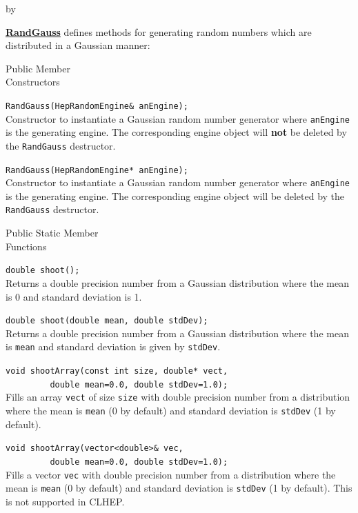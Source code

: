 \documentclass[twoside]{article}
\newcommand{\comp}[1]{\texttt{#1}}%
\newcommand{\entrylabel}[1]{\mbox{\textbf{{#1}}}\hfil}%
\newenvironment{entry}
{\begin{list}{}%
    {\renewcommand{\makelabel}{\entrylabel}%
     \setlength{\labelwidth}{90pt}%
     \setlength{\leftmargin}{\labelwidth}
     \advance\leftmargin by \labelsep%
      }%
    }%
  {\end{list}}
\newcommand{\Entrylabel}[1]%
{\raisebox{0pt}[1ex][0pt]{\makebox[\labelwidth][l]%
    {\parbox[t]{\labelwidth}{\hspace{0pt}\textbf{{#1}}}}}}
\newenvironment{Entry}%
{\renewcommand{\entrylabel}{\Entrylabel}\begin{entry}}%
  {\end{entry}}
\begin{document}
\begin{description}
\begin{Entry}
   \begin{description}
     \item \underline{\bf RandGauss}  defines methods for generating random
      numbers which are distributed in a Gaussian manner:
   \end{description}
   
\item[Public Member\\ Constructors]

   \verb+RandGauss(HepRandomEngine& anEngine);+\\
   Constructor to instantiate a Gaussian random number generator
   where \comp{anEngine} is the generating engine.  The corresponding
   engine object will {\bf not} be deleted by the \comp{RandGauss} destructor.
   
   \verb+RandGauss(HepRandomEngine* anEngine);+\\
   Constructor to instantiate a Gaussian random number generator
   where \comp{anEngine} is the generating engine.  The corresponding
   engine object will be deleted by the \comp{RandGauss} destructor.
  
\item[Public Static Member\\ Functions]
  
   \verb+double shoot();+\\
   Returns a double precision number from a Gaussian distribution where the
   mean is 0 and standard deviation is 1.
  
   \verb+double shoot(double mean, double stdDev);+\\
   Returns a double precision number from a Gaussian distribution where the
   mean is \comp{mean} and standard deviation is given by
   \comp{stdDev}.

  \verb+void shootArray(const int size, double* vect,+\\
  \verb+         double mean=0.0, double stdDev=1.0);+\\
  Fills an array \comp{vect} of size \comp{size} with double
  precision number from a distribution where the
  mean is \comp{mean} (0 by default) and standard
  deviation is \comp{stdDev} (1 by default).

  \verb+void shootArray(vector<double>& vec,+\\
  \verb+         double mean=0.0, double stdDev=1.0);+\\
  Fills a vector \comp{vec} with double
  precision number from a distribution where the
  mean is \comp{mean} (0 by default) and standard
  deviation is \comp{stdDev} (1 by default).  This is not
  supported in CLHEP.
  

\end{Entry}
\end{description}
\end{document}
